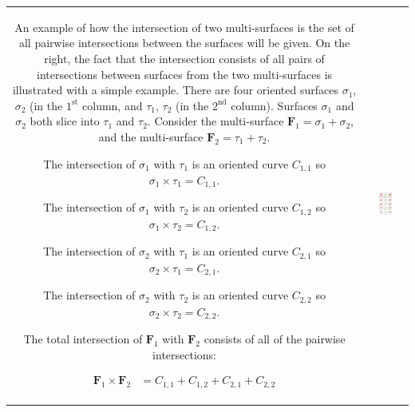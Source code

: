 \documentclass{book}
\begin{document}
\begin{center}
\begin{tabular}{cc}
\parbox{0.5\textwidth}{
An example of how the intersection of two multi-surfaces is the set of all pairwise intersections between the surfaces will be given. On the right, the fact that the intersection consists of all pairs of intersections between surfaces from the two multi-surfaces is illustrated with a simple example. There are four oriented surfaces \(\sigma_1\), \(\sigma_2\) (in the \(1^\text{st}\) column, and \(\tau_1\), \(\tau_2\) (in the \(2^\text{nd}\) column). Surfaces \(\sigma_1\) and \(\sigma_2\) both slice into \(\tau_1\) and \(\tau_2\). Consider the multi-surface \(\mathbf{F}_1 = \sigma_1 + \sigma_2\), and the multi-surface \(\mathbf{F}_2 = \tau_1 + \tau_2\). 

The intersection of \(\sigma_1\) with \(\tau_1\) is an oriented curve \(C_{1,1}\) so \(\sigma_1 \times \tau_1 = C_{1,1}\).  

The intersection of \(\sigma_1\) with \(\tau_2\) is an oriented curve \(C_{1,2}\) so \(\sigma_1 \times \tau_2 = C_{1,2}\).  

The intersection of \(\sigma_2\) with \(\tau_1\) is an oriented curve \(C_{2,1}\) so \(\sigma_2 \times \tau_1 = C_{2,1}\).   

The intersection of \(\sigma_2\) with \(\tau_2\) is an oriented curve \(C_{2,2}\) so \(\sigma_2 \times \tau_2 = C_{2,2}\).     

The total intersection of \(\mathbf{F}_1\) with \(\mathbf{F}_2\) consists of all of the pairwise intersections:

\begin{align*}
\mathbf{F}_1 \times \mathbf{F}_2 & = C_{1,1} + C_{1,2} + C_{2,1} + C_{2,2} 
\end{align*}
} & \parbox{0.4\textwidth}{
\includegraphics[width = 0.4\textwidth]{Intersections/Surface-surface_intersections/surface_surface_intersection_distributive_law}
}
\end{tabular}
\end{center}
\end{document}
